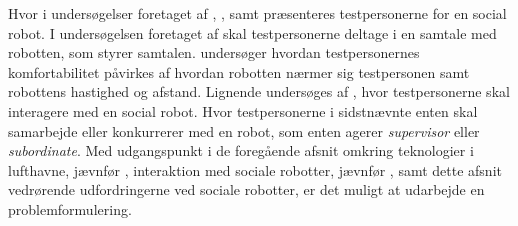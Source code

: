 Hvor i undersøgelser foretaget af \textcite[s. 1480]{PDF:ExploringInfluencingVariable}, \textcite[ss. 190-191]{PDF:PsychologicalEffects}, \textcite[s. 173]{PDF:HowMayIServeYou} samt \textcite[ss. 786-787]{PDF:HowSocialDistanceShapesHRI} præsenteres testpersonerne for en social robot. I undersøgelsen foretaget af \textcite[s. 1480]{PDF:ExploringInfluencingVariable} skal testpersonerne deltage i en samtale med robotten, som styrer samtalen. \textcite[ss. 190-191]{PDF:PsychologicalEffects} undersøger hvordan testpersonernes komfortabilitet påvirkes af hvordan robotten nærmer sig testpersonen samt robottens hastighed og afstand. Lignende undersøges af \textcite[s. 173]{PDF:HowMayIServeYou}, hvor testpersonerne skal interagere med en social robot. Hvor testpersonerne i sidstnævnte enten skal samarbejde eller konkurrerer med en robot, som enten agerer \textit{supervisor} eller \textit{subordinate}.\blankline
%
Med udgangspunkt i de foregående afsnit omkring teknologier i lufthavne, jævnfør , interaktion med sociale robotter, jævnfør , samt dette afsnit vedrørende udfordringerne ved sociale robotter, er det muligt at udarbejde en problemformulering. 
  
